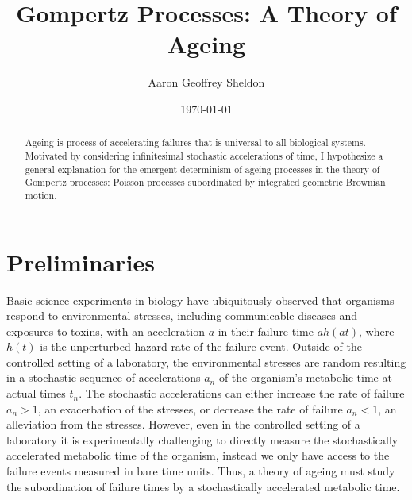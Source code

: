 \documentclass{article}
\title{Gompertz Processes: A Theory of Ageing}
\author{Aaron Geoffrey Sheldon}
\date{\today}
\theoremstyle{definition}\newtheorem{definition}{Definition}
\begin{document}
  \maketitle

  \begin{abstract}
    Ageing is process of accelerating failures that is universal to all biological systems.
    Motivated by considering infinitesimal stochastic accelerations of time, I hypothesize
    a general explanation for the emergent determinism of ageing processes in the theory of
    Gompertz processes: Poisson processes subordinated by integrated geometric Brownian
    motion.
  \end{abstract}

  \section{Preliminaries}
  Basic science experiments in biology have ubiquitously observed that organisms respond to
  environmental stresses, including communicable diseases and exposures to toxins, with an
  acceleration $a$ in their failure time $a h\left(a t\right)$, where $h\left(t\right)$ is
  the unperturbed hazard rate of the failure event. Outside of the controlled setting of a
  laboratory, the environmental stresses are random resulting in a stochastic sequence of
  accelerations $a_n$ of the organism's metabolic time at actual times $t_n$. The stochastic
  accelerations can either increase the rate of failure $a_n > 1$, an exacerbation of the
  stresses, or decrease the rate of failure $a_n < 1$, an alleviation from the stresses.
  However, even in the controlled setting of a laboratory it is experimentally challenging
  to directly measure the stochastically accelerated metabolic time of the organism, instead
  we only have access to the failure events measured in bare time units. Thus, a theory of
  ageing must study the subordination of failure times by a stochastically accelerated
  metabolic time.
\end{document}
